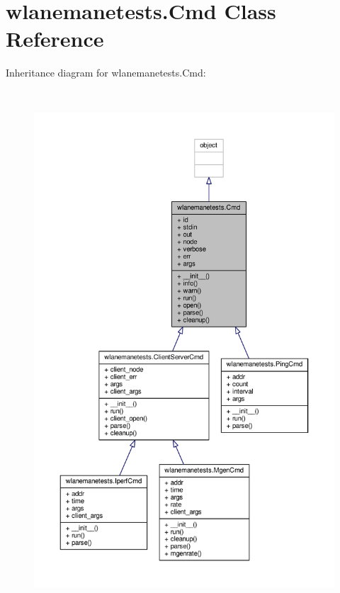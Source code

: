 \hypertarget{classwlanemanetests_1_1_cmd}{\section{wlanemanetests.\+Cmd Class Reference}
\label{classwlanemanetests_1_1_cmd}
}


Inheritance diagram for wlanemanetests.\+Cmd\+:
\nopagebreak
\begin{figure}[H]
\begin{center}
\leavevmode
\includegraphics[height=550pt]{classwlanemanetests_1_1_cmd__inherit__graph}
\end{center}
\end{figure}


